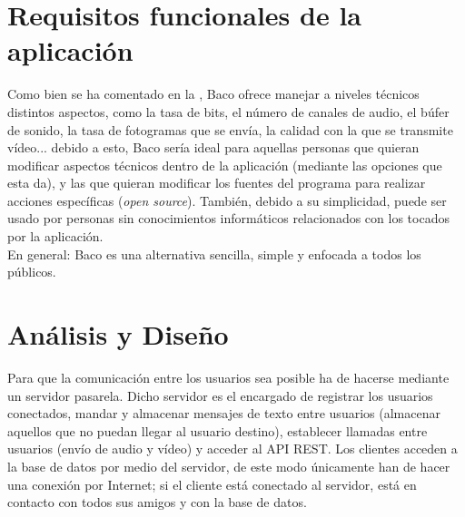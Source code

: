 \documentclass[12pt, a4paper]{book} %
\begin{document}
	\chapter{Requisitos funcionales de la aplicación}
	Como bien se ha comentado en la , Baco ofrece manejar a niveles técnicos distintos aspectos, como la tasa de bits, el número de canales de audio, el búfer de sonido, la tasa de fotogramas que se envía, la calidad con la que se transmite vídeo... debido a esto, Baco sería ideal para aquellas personas que quieran modificar aspectos técnicos dentro de la aplicación (mediante las opciones que esta da), y las que quieran modificar los fuentes del programa para realizar acciones específicas (\textit{open source}). También, debido a su simplicidad, puede ser usado por personas sin conocimientos informáticos relacionados con los tocados por la aplicación.\\
	En general: Baco es una alternativa sencilla, simple y enfocada a todos los públicos.
	
	\chapter{Análisis y Diseño}
	Para que la comunicación entre los usuarios sea posible ha de hacerse mediante un servidor pasarela. Dicho servidor es el encargado de registrar los usuarios conectados, mandar y almacenar mensajes de texto entre usuarios (almacenar aquellos que no puedan llegar al usuario destino), establecer llamadas entre usuarios (envío de audio y vídeo) y acceder al API REST. Los clientes acceden a la base de datos por medio del servidor, de este modo únicamente han de hacer una conexión por Internet; si el cliente está conectado al servidor, está en contacto con todos sus amigos y con la base de datos.
\end{document}
